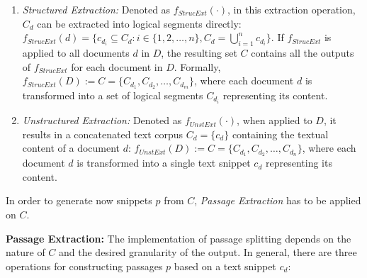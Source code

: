 \begin{enumerate}
    \item \textit{Structured Extraction:} Denoted as $f_{StrucExt}(\cdot)$, in this extraction operation, $C_d$ can be extracted into logical segments directly: $f_{StrucExt}(d) = \{c_{d_i} \subseteq C_d : i \in \{1, 2, \ldots, n\}, C_d = \bigcup_{i=1}^{n} c_{d_i}\}$. If $f_{StrucExt}$ is applied to all documents $d$ in $D$, the resulting set $C$ contains all the outputs of $f_{StrucExt}$ for each document in $D$. Formally, $f_{StrucExt}(D) := C = \{C_{d_1}, C_{d_2}, \dots, C_{d_m}\}$, where each document $d$ is transformed into a set of logical segments $C_{d_i}$ representing its content.
    \item \textit{Unstructured Extraction:} Denoted as $f_{UnstExt}(\cdot)$, when applied to $D$, it results in a concatenated text corpus $C_d = \{c_d\} $ containing the textual content of a document $d$: $f_{UnstExt}(D) := C = \{C_{d_1}, C_{d_2}, \dots, C_{d_n}\}$, where each document $d$ is transformed into a single text snippet $c_d$ representing its content.
\end{enumerate}

In order to generate now snippets $p$ from $C$, \textit{Passage Extraction} has to be applied on $C$.

\vspace{\baselineskip} %

\noindent\textbf{Passage Extraction:} The implementation of passage splitting depends on the nature of $C$ and the desired granularity of the output. In general, there are three operations for constructing passages $p$ based on a text snippet $c_d$:

